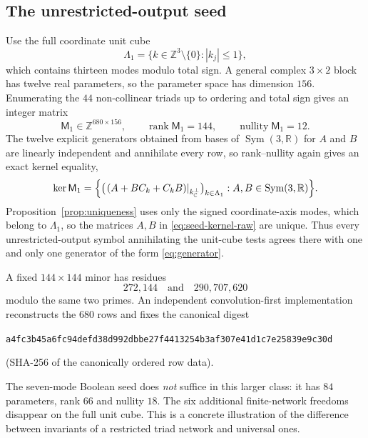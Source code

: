 \documentclass[11pt]{article}
\theoremstyle{definition}
\theoremstyle{remark}
\theoremstyle{plain}
\DeclareMathOperator{\Sym}{Sym}
\DeclareMathOperator{\rank}{rank}
\DeclareMathOperator{\nullity}{nullity}
\newcommand{\Z}{\mathbb{Z}}
\newcommand{\R}{\mathbb{R}}
\newcommand{\C}{\mathbb{C}}
\newcommand{\Ck}{C_k}
\newcommand{\kperp}{k_{\C}^{\perp}}
\begin{document}
\subsection{The unrestricted-output seed}
\label{subsec:rawseed}

Use the full coordinate unit cube
\begin{equation}
\label{eq:unitcube}
\Lambda_{1}=\{k\in\Z^{3}\setminus\{0\}:|k_{j}|\le1\},
\end{equation}
which contains thirteen modes modulo total sign. A general complex $3\times2$
block has twelve real parameters, so the parameter space has dimension $156$.
Enumerating the $44$ non-collinear triads up to ordering and total sign gives an
integer matrix
\begin{equation}
\label{eq:M1}
\mathsf M_{1}\in\Z^{680\times156},
\qquad
\rank\mathsf M_{1}=144,
\qquad
\nullity\mathsf M_{1}=12 .
\end{equation}
The twelve explicit generators obtained from bases of $\Sym(3,\R)$ for $A$ and
$B$ are linearly independent and annihilate every row, so rank--nullity again
gives an exact kernel equality,
\begin{equation}
\label{eq:seed-kernel-raw}
\ker\mathsf M_{1}
=\Bigl\{
\bigl(\left.(A+B\Ck+\Ck B)\right|_{\kperp}\bigr)_{k\in\Lambda_{1}}
:A,B\in\Sym(3,\R)
\Bigr\}.
\end{equation}
Proposition~\ref{prop:uniqueness} uses only the signed coordinate-axis modes,
which belong to $\Lambda_{1}$, so the matrices $A,B$ in
\eqref{eq:seed-kernel-raw} are unique. Thus every unrestricted-output symbol
annihilating the unit-cube tests agrees there with one and only one generator
of the form \eqref{eq:generator}.

A fixed $144\times144$ minor has residues
\begin{equation}
\label{eq:rawminor}
272{,}144
\quad\text{and}\quad
290{,}707{,}620
\end{equation}
modulo the same two primes. An independent convolution-first implementation
reconstructs the $680$ rows and fixes the canonical digest
\begin{center}
\texttt{a4fc3b45a6fc94defd38d992dbbe27f4413254b3af307e41d1c7e25839e9c30d}
\end{center}
(SHA-256 of the canonically ordered row data).

The seven-mode Boolean seed does \emph{not} suffice in this larger class: it
has $84$ parameters, rank $66$ and nullity $18$. The six additional
finite-network freedoms disappear on the full unit cube. This is a concrete
illustration of the difference between invariants of a restricted triad
network and universal ones.
\end{document}
